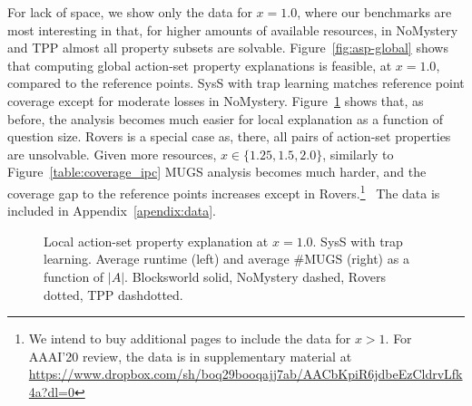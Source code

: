 For lack of space, we show only the data for $x = 1.0$, where our
benchmarks are most interesting in that, for higher amounts of
available resources, in NoMystery and TPP almost all property subsets
are solvable.
%
Figure~\ref{fig:asp-global} shows that computing global action-set
property explanations is feasible, at $x=1.0$, compared to the
reference points. SysS with trap learning matches reference point
coverage except for moderate losses in NoMystery.
%
Figure~\ref{fig:asp-local} shows that, as before, the analysis becomes
much easier for local explanation as a function of question size.
%
Rovers is a special case as, there, all pairs of action-set properties
are unsolvable.
%
Given more resources, $x \in \{1.25, 1.5, 2.0\}$, 
%
%
%
similarly to Figure~\ref{table:coverage_ipc} MUGS analysis becomes
much harder, and the coverage gap to the reference points increases
except in Rovers.\ifdefined\suppflagdefined\else\footnote{We intend to
buy additional pages to include the data for $x > 1$. For AAAI'20
review, the data is in supplementary material at
{\scriptsize \url{https://www.dropbox.com/sh/boq29booqajj7ab/AACbKpiR6jdbeEzCldrvLfk4a?dl=0}}}\fi\
%
\ifdefined\suppflagdefined
%
The data is included in Appendix~\ref{apendix:data}.
%
\fi


\begin{figure}[t]
\vspace{-0.0cm}
\small
\centering


\vspace{-0.3cm}
\caption{\label{fig:asp-local} Local action-set property explanation 
at $x=1.0$. SysS with trap learning. Average runtime (left) and
average \#MUGS (right) as a function of $|A|$. Blocksworld solid,
NoMystery dashed, Rovers dotted, TPP dashdotted.
}
\vspace{-0.6cm}
\end{figure}











